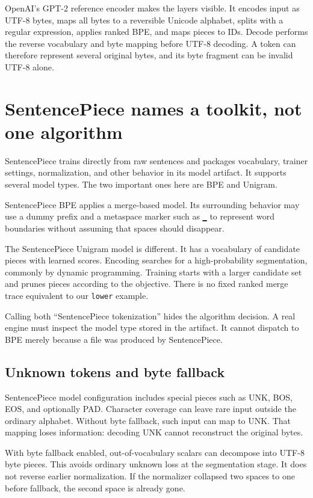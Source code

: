 OpenAI's GPT-2 reference encoder makes the layers visible. It encodes
input as UTF-8 bytes, maps all bytes to a reversible Unicode alphabet,
splits with a regular expression, applies ranked BPE, and maps pieces to
IDs. Decode performs the reverse vocabulary and byte mapping before
UTF-8 decoding. A token can therefore represent several original bytes,
and its byte fragment can be invalid UTF-8 alone.

\section{SentencePiece names a toolkit, not one
algorithm}\label{sentencepiece-names-a-toolkit-not-one-algorithm}

SentencePiece trains directly from raw sentences and packages
vocabulary, trainer settings, normalization, and other behavior in its
model artifact. It supports several model types. The two important ones
here are BPE and Unigram.

SentencePiece BPE applies a merge-based model. Its surrounding behavior
may use a dummy prefix and a metaspace marker such as \texttt{▁} to
represent word boundaries without assuming that spaces should disappear.

The SentencePiece Unigram model is different. It has a vocabulary of
candidate pieces with learned scores. Encoding searches for a
high-probability segmentation, commonly by dynamic programming. Training
starts with a larger candidate set and prunes pieces according to the
objective. There is no fixed ranked merge trace equivalent to our
\texttt{lower} example.

Calling both ``SentencePiece tokenization'' hides the algorithm
decision. A real engine must inspect the model type stored in the
artifact. It cannot dispatch to BPE merely because a file was produced
by SentencePiece.

\subsection{Unknown tokens and byte
fallback}\label{unknown-tokens-and-byte-fallback}

SentencePiece model configuration includes special pieces such as UNK,
BOS, EOS, and optionally PAD. Character coverage can leave rare input
outside the ordinary alphabet. Without byte fallback, such input can map
to UNK. That mapping loses information: decoding UNK cannot reconstruct
the original bytes.

With byte fallback enabled, out-of-vocabulary scalars can decompose into
UTF-8 byte pieces. This avoids ordinary unknown loss at the segmentation
stage. It does not reverse earlier normalization. If the normalizer
collapsed two spaces to one before fallback, the second space is already
gone.

